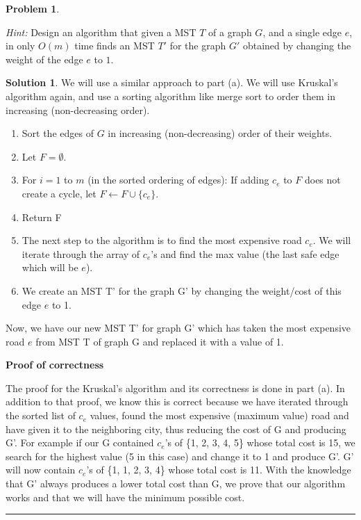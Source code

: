 \documentclass{article}
\theoremstyle{definition}
\newtheorem{problem}{Problem}
\def\fline{\rule{0.75\linewidth}{0.5pt}}
\newcommand{\finishline}{\begin{center}\fline\end{center}}
\newtheorem*{solution*}{Solution}
\newenvironment{solution}{\begin{solution*}}{{\finishline} \end{solution*}}
\begin{document}
\begin{problem}
\begin{enumerate}
		 \smallskip
		 \emph{Hint:} Design an algorithm that given a MST $T$ of a graph $G$, and a single edge $e$, in only $O(m)$ time finds an MST $T'$ for the graph $G'$ obtained by changing the weight of the edge $e$ to $1$. 
		 
		 \medskip

\begin{solution}
\item We will use a similar approach to part (a). We will use Kruskal's algorithm again, and use a sorting algorithm like merge sort to order them in increasing (non-decreasing order).  
\begin{enumerate}
\item Sort the edges of $G$ in increasing (non-decreasing) order of their weights.
\item Let $F = \emptyset$.
\item For $i = 1$ to $m$ (in the sorted ordering of edges): If adding $c_e$ to $F$ does not create a cycle, let $F \leftarrow F \cup \{c_e\}$.
\item Return F
\item The next step to the algorithm is to find the most expensive road $c_e$. We will iterate through the array of $c_e$'s and find the max value (the last safe edge which will be $e$).  
\item We create an MST T' for the graph G' by changing the weight/cost of this edge $e$ to 1. 
\end{enumerate}
\item Now, we have our new MST T' for graph G' which has taken the most expensive road $e$ from MST T of graph G and replaced it with a value of 1. 

\item \textbf{Proof of correctness}
\item The proof for the Kruskal's algorithm and its correctness is done in part (a). In addition to that proof, we know this is correct because we have iterated through the sorted list of $c_e$ values, found the most expensive (maximum value) road and have given it to the neighboring city, thus reducing the cost of G and producing G'. For example if our G contained $c_e$'s of \{1, 2, 3, 4, 5\} whose total cost is 15, we search for the highest value (5 in this case) and change it to 1 and produce G'. G' will now contain $c_e$'s of \{1, 1, 2, 3, 4\}  whose total cost is 11. With the knowledge that G' always produces a lower total cost than G, we prove that our algorithm works and that we will have the minimum possible cost.


\end{solution}
\end{enumerate}
\end{problem}
\end{document}
